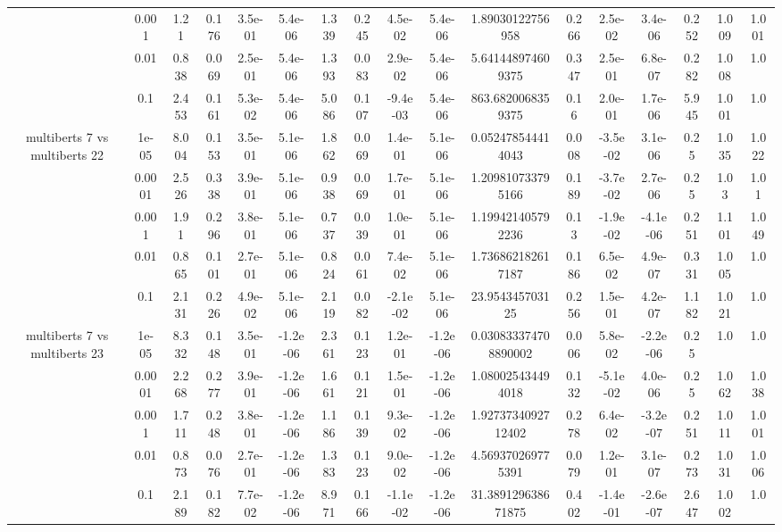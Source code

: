 \begin{tabular}{|c|c|c|c|c|c|c|c|c|c|c|c|c|c|c|c|c|}
 & 0.001 & 1.21 & 0.176 & 3.5e-01 & 5.4e-06 & 1.339 & 0.245 & 4.5e-02 & 5.4e-06 & 1.89030122756958 & 0.266 & 2.5e-02 & 3.4e-06 & 0.252 & 1.009 & 1.001 \\
 & 0.01 & 0.838 & 0.069 & 2.5e-01 & 5.4e-06 & 1.393 & 0.083 & 2.9e-02 & 5.4e-06 & 5.641448974609375 & 0.347 & 2.5e-01 & 6.8e-07 & 0.282 & 1.008 & 1.0 \\
 & 0.1 & 2.453 & 0.161 & 5.3e-02 & 5.4e-06 & 5.086 & 0.107 & -9.4e-03 & 5.4e-06 & 863.6820068359375 & 0.16 & 2.0e-01 & 1.7e-06 & 5.945 & 1.001 & 1.0 \\
\hline
\multirow{5}{*}{multiberts 7 vs multiberts 22} & 1e-05 & 8.004 & 0.153 & 3.5e-01 & 5.1e-06 & 1.862 & 0.069 & 1.4e-01 & 5.1e-06 & 0.052478544414043 & 0.008 & -3.5e-02 & 3.1e-06 & 0.25 & 1.035 & 1.022 \\
 & 0.0001 & 2.526 & 0.338 & 3.9e-01 & 5.1e-06 & 0.938 & 0.069 & 1.7e-01 & 5.1e-06 & 1.209810733795166 & 0.189 & -3.7e-02 & 2.7e-06 & 0.25 & 1.03 & 1.01 \\
 & 0.001 & 1.91 & 0.296 & 3.8e-01 & 5.1e-06 & 0.737 & 0.039 & 1.0e-01 & 5.1e-06 & 1.199421405792236 & 0.13 & -1.9e-02 & -4.1e-06 & 0.251 & 1.101 & 1.049 \\
 & 0.01 & 0.865 & 0.101 & 2.7e-01 & 5.1e-06 & 0.824 & 0.061 & 7.4e-02 & 5.1e-06 & 1.736862182617187 & 0.186 & 6.5e-02 & 4.9e-07 & 0.331 & 1.005 & 1.0 \\
 & 0.1 & 2.131 & 0.226 & 4.9e-02 & 5.1e-06 & 2.119 & 0.082 & -2.1e-02 & 5.1e-06 & 23.954345703125 & 0.256 & 1.5e-01 & 4.2e-07 & 1.182 & 1.021 & 1.0 \\
\hline
\multirow{5}{*}{multiberts 7 vs multiberts 23} & 1e-05 & 8.332 & 0.148 & 3.5e-01 & -1.2e-06 & 2.361 & 0.123 & 1.2e-01 & -1.2e-06 & 0.030833374708890002 & 0.006 & 5.8e-02 & -2.2e-06 & 0.25 & 1.0 & 1.0 \\
 & 0.0001 & 2.268 & 0.277 & 3.9e-01 & -1.2e-06 & 1.661 & 0.121 & 1.5e-01 & -1.2e-06 & 1.080025434494018 & 0.132 & -5.1e-02 & 4.0e-06 & 0.25 & 1.062 & 1.038 \\
 & 0.001 & 1.711 & 0.248 & 3.8e-01 & -1.2e-06 & 1.186 & 0.139 & 9.3e-02 & -1.2e-06 & 1.9273734092712402 & 0.278 & 6.4e-02 & -3.2e-07 & 0.251 & 1.011 & 1.001 \\
 & 0.01 & 0.873 & 0.076 & 2.7e-01 & -1.2e-06 & 1.383 & 0.123 & 9.0e-02 & -1.2e-06 & 4.569370269775391 & 0.079 & 1.2e-01 & 3.1e-07 & 0.273 & 1.031 & 1.006 \\
 & 0.1 & 2.189 & 0.182 & 7.7e-02 & -1.2e-06 & 8.971 & 0.166 & -1.1e-02 & -1.2e-06 & 31.389129638671875 & 0.402 & -1.4e-01 & -2.6e-07 & 2.647 & 1.002 & 1.0 \\

\end{tabular}
